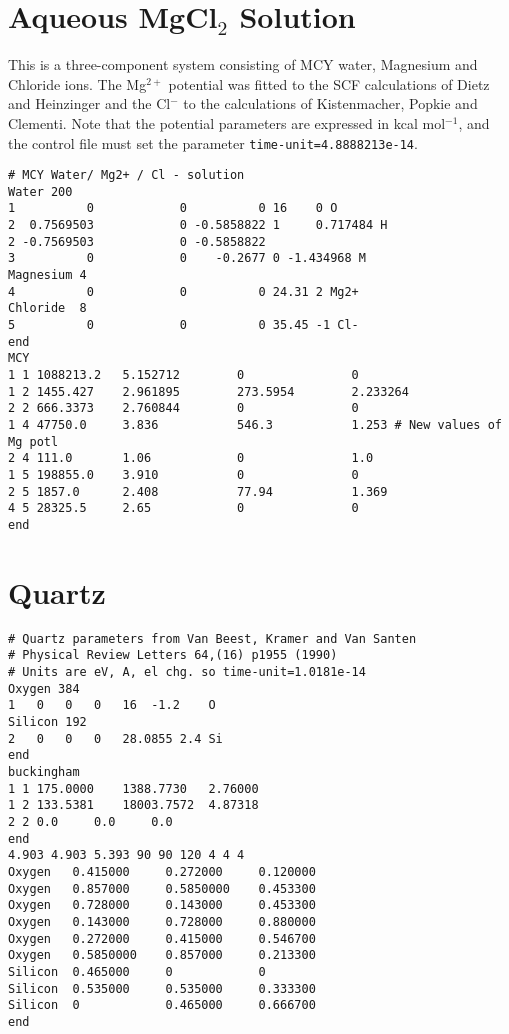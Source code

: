 \section{Aqueous MgCl$_2$ Solution}%
This is a three-component system consisting of MCY
water\cite{matsuoka:75}, Magnesium and Chloride ions.  The Mg$^{2+}$
potential was fitted to the SCF calculations of Dietz and
Heinzinger\cite{dietz:82} and the Cl$^-$ to the calculations of
Kistenmacher, Popkie and Clementi\cite{kistenmacher:73b}.  Note that
the potential parameters are expressed in kcal mol$^{-1}$, and the
control file must set the parameter \verb'time-unit=4.8888213e-14'.
\begin{verbatim}
# MCY Water/ Mg2+ / Cl - solution
Water 200
1          0            0          0 16    0 O
2  0.7569503            0 -0.5858822 1     0.717484 H
2 -0.7569503            0 -0.5858822
3          0            0    -0.2677 0 -1.434968 M
Magnesium 4
4          0            0          0 24.31 2 Mg2+
Chloride  8
5          0            0          0 35.45 -1 Cl-
end
MCY
1 1 1088213.2   5.152712        0               0
1 2 1455.427    2.961895        273.5954        2.233264
2 2 666.3373    2.760844        0               0
1 4 47750.0     3.836           546.3           1.253 # New values of Mg potl
2 4 111.0       1.06            0               1.0   
1 5 198855.0    3.910           0               0
2 5 1857.0      2.408           77.94           1.369
4 5 28325.5     2.65            0               0
end
\end{verbatim}
\section{Quartz}%
\begin{verbatim}
# Quartz parameters from Van Beest, Kramer and Van Santen
# Physical Review Letters 64,(16) p1955 (1990)
# Units are eV, A, el chg. so time-unit=1.0181e-14
Oxygen 384
1	0	0	0	16	-1.2	O
Silicon 192
2	0	0	0	28.0855	2.4	Si
end
buckingham
1 1	175.0000	1388.7730	2.76000
1 2	133.5381	18003.7572	4.87318
2 2	0.0		0.0		0.0
end
4.903 4.903 5.393 90 90 120 4 4 4
Oxygen   0.415000     0.272000     0.120000
Oxygen   0.857000     0.5850000    0.453300
Oxygen   0.728000     0.143000     0.453300
Oxygen   0.143000     0.728000     0.880000
Oxygen   0.272000     0.415000     0.546700
Oxygen   0.5850000    0.857000     0.213300
Silicon	 0.465000     0            0
Silicon	 0.535000     0.535000     0.333300
Silicon	 0            0.465000     0.666700
end
\end{verbatim}
